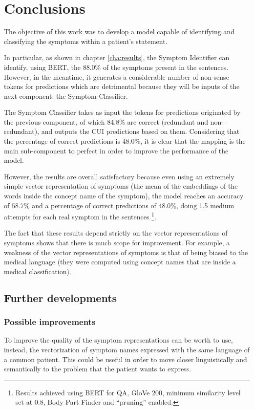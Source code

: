 \chapter{Conclusions}
\label{cha:conclusions}

The objective of this work was to develop a model capable of identifying and classifying the symptoms within a patient's statement.

In particular, as shown in chapter \ref{cha:results}, the Symptom Identifier can identify, using BERT, the $88.0 \%$ of the symptoms present in the sentences. However, in the meantime, it generates a considerable number of non-sense tokens for predictions which are detrimental because they will be inputs of the next component: the Symptom Classifier.

The Symptom Classifier takes as input the tokens for predictions originated by the previous component, of which $84.8 \%$ are correct (redundant and non-redundant), and outputs the CUI predictions based on them. Considering that the percentage of correct predictions is $48.0 \%$, it is clear that the mapping is the main sub-component to perfect in order to improve the performance of the model.

However, the results are overall satisfactory because even using an extremely simple vector representation of symptoms (the mean of the embeddings of the words inside the concept name of the symptom), the model reaches an accuracy of $58.7 \%$ and a percentage of correct predictions of $48.0 \%$, doing 1.5 medium attempts for each real symptom in the sentences \footnote{Results achieved using BERT for QA, GloVe 200, minimum similarity level set at 0.8, Body Part Finder and ``pruning'' enabled.}.

The fact that these results depend strictly on the vector representations of symptoms shows that there is much scope for improvement. For example, a weakness of the vector representations of symptoms is that of being biased to the medical language (they were computed using concept names that are inside a medical classification). 

\section{Further developments}

\subsection*{Possible improvements}
To improve the quality of the symptom representations can be worth to use, instead, the vectorization of symptom names expressed with the same language of a common patient. This could be useful in order to move closer linguistically and semantically to the problem that the patient wants to express.

